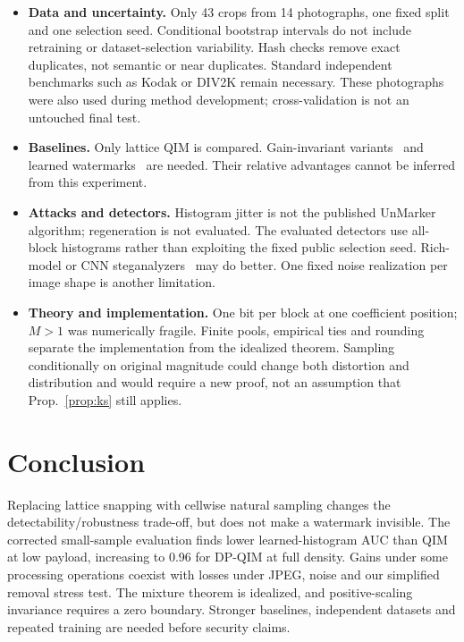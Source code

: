 \documentclass[conference,10pt]{IEEEtran}
\begin{document}
\begin{itemize}
\item \textbf{Data and uncertainty.} Only 43 crops from 14 photographs,
one fixed split and one selection seed. Conditional bootstrap intervals
do not include retraining or dataset-selection variability. Hash checks
remove exact duplicates, not semantic or near duplicates. Standard independent
benchmarks such as Kodak or DIV2K remain necessary. These photographs were also
used during method development; cross-validation is not an untouched final test.
\item \textbf{Baselines.} Only lattice QIM is compared. Gain-invariant
variants~\cite{PerezGonzalez2005rdm,Ourique2005angleqim,Li2007perceptualqim}
and learned watermarks~\cite{Zhu2018hidden,Tancik2020stegastamp} are needed.
Their relative advantages cannot be inferred from this experiment.
\item \textbf{Attacks and detectors.} Histogram jitter is not the published
UnMarker algorithm; regeneration is not evaluated. The evaluated detectors
use all-block histograms rather than exploiting the fixed public selection
seed. Rich-model or CNN steganalyzers~\cite{Fridrich2012richmodels} may do better.
One fixed noise realization per image shape is another limitation.
\item \textbf{Theory and implementation.} One bit per block at one coefficient
position; $M>1$ was numerically fragile. Finite pools, empirical ties and rounding
separate the implementation from the idealized theorem. Sampling conditionally
on original magnitude could change both distortion and distribution and would
require a new proof, not an assumption that Prop.~\ref{prop:ks} still applies.
\end{itemize}

\section{Conclusion}
\label{sec:conclusion}
Replacing lattice snapping with cellwise natural sampling changes the
detectability/robustness trade-off, but does not make a watermark invisible.
The corrected small-sample evaluation finds lower learned-histogram AUC than
QIM at low payload, increasing to 0.96 for DP-QIM at full density. Gains under
some processing operations coexist with losses under JPEG, noise and our
simplified removal stress test. The mixture theorem is idealized, and
positive-scaling invariance requires a zero boundary. Stronger baselines,
independent datasets and repeated training are needed before security claims.
\end{document}
